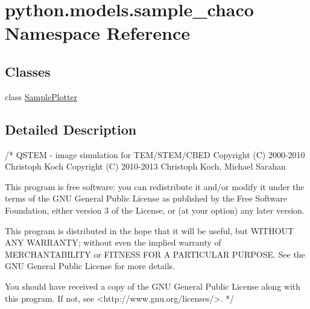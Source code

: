 \hypertarget{namespacepython_1_1models_1_1sample__chaco}{\section{python.\-models.\-sample\-\_\-chaco Namespace Reference}
\label{namespacepython_1_1models_1_1sample__chaco}
}
\subsection*{Classes}
\begin{DoxyCompactItemize}
\item 
class \hyperlink{classpython_1_1models_1_1sample__chaco_1_1_sample_plotter}{Sample\-Plotter}
\end{DoxyCompactItemize}


\subsection{Detailed Description}
\begin{DoxyVerb}/*
QSTEM - image simulation for TEM/STEM/CBED
    Copyright (C) 2000-2010  Christoph Koch
    Copyright (C) 2010-2013  Christoph Koch, Michael Sarahan

    This program is free software: you can redistribute it and/or modify
    it under the terms of the GNU General Public License as published by
    the Free Software Foundation, either version 3 of the License, or
    (at your option) any later version.

    This program is distributed in the hope that it will be useful,
    but WITHOUT ANY WARRANTY; without even the implied warranty of
    MERCHANTABILITY or FITNESS FOR A PARTICULAR PURPOSE.  See the
    GNU General Public License for more details.

    You should have received a copy of the GNU General Public License
    along with this program.  If not, see <http://www.gnu.org/licenses/>.
*/
\end{DoxyVerb}
 